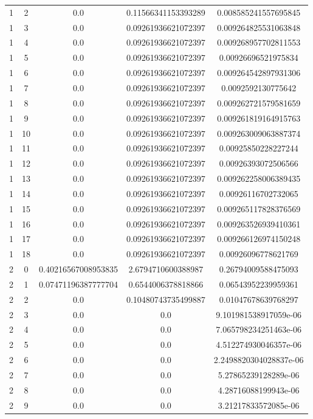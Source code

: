 \documentclass{article}
\begin{document}
\begin{table}[h]
\begin{tabular}{|c|c|c|c|c|}
1 & 2 & 0.0 & 0.11566341153393289 & 0.008585241557695845 \\
1 & 3 & 0.0 & 0.09261936621072397 & 0.009264825531063848 \\
1 & 4 & 0.0 & 0.09261936621072397 & 0.009268957702811553 \\
1 & 5 & 0.0 & 0.09261936621072397 & 0.00926696521975834 \\
1 & 6 & 0.0 & 0.09261936621072397 & 0.009264542897931306 \\
1 & 7 & 0.0 & 0.09261936621072397 & 0.0092592130775642 \\
1 & 8 & 0.0 & 0.09261936621072397 & 0.009262721579581659 \\
1 & 9 & 0.0 & 0.09261936621072397 & 0.009261819164915763 \\
1 & 10 & 0.0 & 0.09261936621072397 & 0.009263009063887374 \\
1 & 11 & 0.0 & 0.09261936621072397 & 0.00925850228227244 \\
1 & 12 & 0.0 & 0.09261936621072397 & 0.00926393072506566 \\
1 & 13 & 0.0 & 0.09261936621072397 & 0.009262258006389435 \\
1 & 14 & 0.0 & 0.09261936621072397 & 0.00926116702732065 \\
1 & 15 & 0.0 & 0.09261936621072397 & 0.009265117828376569 \\
1 & 16 & 0.0 & 0.09261936621072397 & 0.009263526939410361 \\
1 & 17 & 0.0 & 0.09261936621072397 & 0.009266126974150248 \\
1 & 18 & 0.0 & 0.09261936621072397 & 0.00926096778621769 \\
2 & 0 & 0.40216567008953835 & 2.6794710600388987 & 0.26794009588475093 \\
2 & 1 & 0.07471196387777704 & 0.6544006378818866 & 0.06543952239959361 \\
2 & 2 & 0.0 & 0.10480743735499887 & 0.01047678639768297 \\
2 & 3 & 0.0 & 0.0 & 9.101981538917059e-06 \\
2 & 4 & 0.0 & 0.0 & 7.065798234251463e-06 \\
2 & 5 & 0.0 & 0.0 & 4.512274930046357e-06 \\
2 & 6 & 0.0 & 0.0 & 2.2498820304028837e-06 \\
2 & 7 & 0.0 & 0.0 & 5.27865239128289e-06 \\
2 & 8 & 0.0 & 0.0 & 4.28716088199943e-06 \\
2 & 9 & 0.0 & 0.0 & 3.21217833572085e-06 \\

\end{tabular}
\end{table}
\end{document}
